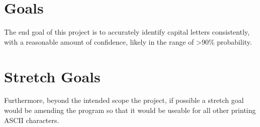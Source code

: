 \documentclass{article}
\begin{document}
\section{Goals}
The end goal of this project is to accurately identify capital letters consistently, with a reasonable 
amount of confidence, likely in the range of >90\% probability.
\section{Stretch Goals}
Furthermore, beyond the intended scope the project, if possible a stretch goal would be amending 
the program so that it would be useable for all other printing ASCII characters.
\end{document}
